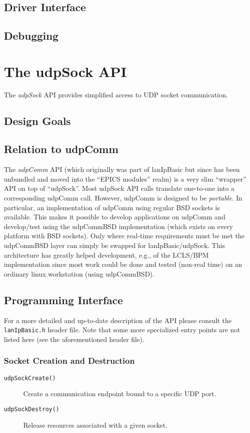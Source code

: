 \documentclass{article}
\newcommand{\lip}{lanIpBasic}
\newcommand{\lipc}[1]{{\tt #1}}
\begin{document}
  \subsection{Driver Interface}
  \subsection{Debugging}
\section{The udpSock API}
  The {\em udpSock} API provides simplified access to UDP socket
  communication.
  \subsection{Design Goals}
  \subsection{Relation to udpComm}
  The {\em udpComm} API (which originally was part of \lip{} but 
  since has been unbundled and moved into the ``EPICS modules''
  realm) is a very slim ``wrapper'' API on top of ``udpSock''.
  Most udpSock API calls translate one-to-one into a corresponding
  udpComm call. However, udpComm is designed to be {\em portable}.
  In particular, an implementation of udpComm using regular BSD
  sockets is available. This makes it possible to develop applications
  on udpComm and develop/test using the udpCommBSD implementation
  (which exists on every platform with BSD sockets). Only where
  real-time requirements must be met the udpCommBSD layer can
  simply be swapped for \lip{}/udpSock. This architecture has
  greatly helped development, e.g., of the LCLS/BPM implementation
  since most work could be done and tested (non-real time) on
  an ordinary linux workstation (using udpCommBSD).

  \subsection{Programming Interface}
  For a more detailed and up-to-date description of the 
  API please consult the \lipc{lanIpBasic.h} header file.
  Note that some more specialized entry points are not
  listed here (see the aforementioned header file).

  \subsubsection{Socket Creation and Destruction}
  \begin{description}
  \item[\lipc{udpSockCreate()}] Create a communication endpoint
  bound to a specific UDP port.
  \item[\lipc{udpSockDestroy()}] Release resources associated with
  a given socket.
  \end{description}
\end{document}
